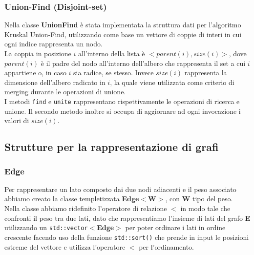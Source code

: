\documentclass[]{article}
\begin{document}
\subsubsection{Union-Find (Disjoint-set)}
Nella classe \textbf{UnionFind} è stata implementata la struttura dati per l'algoritmo Kruskal Union-Find, utilizzando come base un vettore di coppie di interi in cui ogni indice rappresenta un nodo.\\
La coppia in posizione $i$ all'interno della lista è $<parent(i), size(i)>$, dove $parent(i)$ è il padre del nodo all'interno dell'albero che rappresenta il set a cui $i$ appartiene o, in caso $i$ sia radice, se stesso. Invece $size(i)$ rappresenta la dimensione dell'albero radicato in $i$, la quale viene utilizzata come criterio di merging durante le operazioni di unione.\\
I metodi \verb|find| e \verb|unite| rappresentano rispettivamente le operazioni di ricerca e unione. Il secondo metodo inoltre si occupa di aggiornare ad ogni invocazione i valori di $size(i)$.
\newpage
\subsection{Strutture per la rappresentazione di grafi}
\subsubsection{Edge}
Per rappresentare un lato composto dai due nodi adiacenti e il peso associato abbiamo creato la classe templetizzata \textbf{Edge$<$W$>$}, con \textbf{W} tipo del peso.\\
Nella classe abbiamo ridefinito l'operatore di relazione \textbf{$<$} in modo tale che confronti il peso tra due lati, dato che rappresentiamo l'insieme di lati del grafo \textbf{E} utilizzando un \verb|std::vector|$<$\textbf{Edge}$>$ per poter ordinare i lati in ordine crescente facendo uso della funzione \verb|std::sort()| che prende in input le posizioni estreme del vettore e utilizza l'operatore \textbf{$<$} per l'ordinamento.
\end{document}
